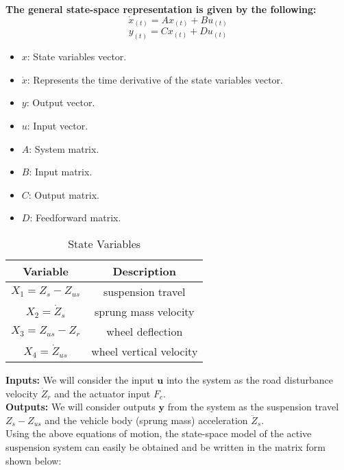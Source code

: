 \textbf{The general state-space representation is given by the following:}
$$\dot{x}_{(t)}=Ax_{(t)}+Bu_{(t)}$$
$$y_{(t)}=Cx_{(t)}+Du_{(t)}$$

\begin{itemize}
	\item $x$: State variables vector.
	\item $\dot{x}$: Represents the time derivative of the state variables vector.
	\item $y$: Output vector.
	\item $u$: Input vector.
	\item $A$: System matrix.
	\item $B$: Input matrix.
	\item $C$: Output matrix.
	\item $D$: Feedforward matrix.\\
\end{itemize}


\begin{table}[h!] %
	\centering
	\caption{State Variables} 
	\begin{tabular}{|c|c|}
		\hline
		\textbf{Variable} & \textbf{Description} \\ \hline
		$X_1 = Z_s - Z_{us}$ & suspension travel \\ \hline
		$X_2 = \dot{Z}_s$ & sprung mass velocity \\ \hline
		$X_3 = Z_{us} - Z_r$ & wheel deflection \\ \hline
		$X_4 = \dot{Z}_{us}$ & wheel vertical velocity \\ \hline
	\end{tabular}
\end{table}



\newpage
\textbf{Inputs:} We will consider the input $\boldsymbol{u}$ into the system as the road disturbance velocity $\dot{Z}_r$ and the actuator input $F_c$.\\

\textbf{Outputs:} We will consider outputs $\boldsymbol{y}$ from the system as the suspension travel $Z_s-Z_{us}$ and the vehicle body (sprung mass) acceleration $\ddot{Z}_s$.\\

Using the above equations of motion, the state-space model of the active suspension system can easily be obtained and be written in the matrix form shown below:

